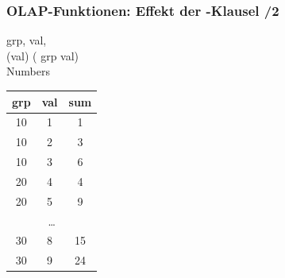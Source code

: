     
      \begin{frame}
    
    \frametitle{OLAP-Funktionen: Effekt der -Klausel /2}
    
    \begin{sql}
       grp, val, \\
      \1 (val) ( grp  val)  \\
       Numbers
    \end{sql}
    
    \begin{center}
      \begin{tabular}{|c|c|c|}
      \hline
      \rowcolor{Gray} grp & val & sum  \\
      \hline \hline
      10 & 1 & 1 \\
      10 & 2 & 3 \\
      10 & 3 & 6 \\
      20 & 4 & 4 \\
      20 & 5 & 9 \\
    \multicolumn{3}{|c|}{\dots} \\
    30 & 8 & 15 \\
    30 & 9 & 24 \\
      \hline
      \end{tabular}
      \end{center}
    
    \end{frame}
    
